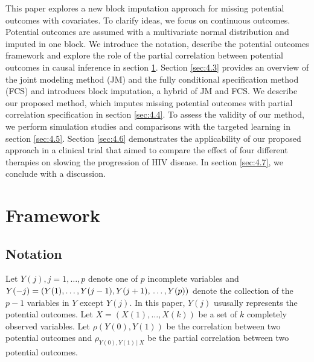 	This paper explores a new block imputation approach for missing potential outcomes with covariates. To clarify ideas, we focus on continuous outcomes. Potential outcomes are assumed with a multivariate normal distribution and imputed in one block. We introduce the notation, describe the potential outcomes framework and explore the role of the partial correlation between potential outcomes in causal inference in section \ref{sec:4.2}. Section \ref{sec:4.3} provides an overview of the joint modeling method (JM) and the fully conditional specification method (FCS) and introduces block imputation, a hybrid of JM and FCS. We describe our proposed method, which imputes missing potential outcomes with partial correlation specification in section \ref{sec:4.4}. To assess the validity of our method, we perform simulation studies and comparisons with the targeted learning in section \ref{sec:4.5}. Section \ref{sec:4.6} demonstrates the applicability of our proposed approach in a clinical trial that aimed to compare the effect of four different therapies on slowing the progression of HIV disease. In section \ref{sec:4.7}, we conclude with a discussion. 
	
	\section{Framework}
	\label{sec:4.2}
	\subsection{Notation}
	Let ${Y(j), j = 1, \dots, p}$ denote one of $p$ incomplete variables and $Y(-j) = (Y(1), \dots, Y(j-1), Y(j+1),\\ \dots, Y(p))$ denote the collection of the $p-1$ variables in $Y$ except $Y(j)$. In this paper, $Y(j)$ ususally represents the potential outcomes. Let $X = (X(1), \dots, X(k))$ be a set of $k$ completely observed variables. Let $\rho(Y(0), Y(1))$ be the correlation between two potential outcomes and $\rho_{Y(0), Y(1)\,|\ X}$ be the partial correlation between two potential outcomes. 
